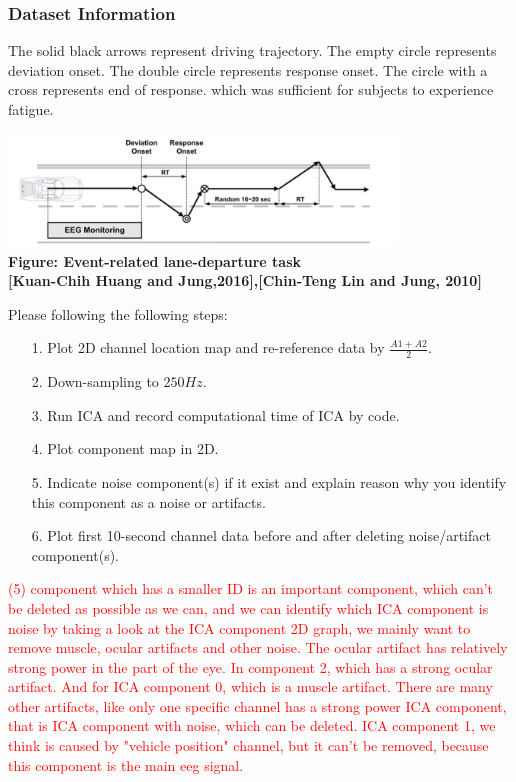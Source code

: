 \documentclass[a4 paper]{article}
\begin{document}
\subsubsection{Dataset Information}
The solid black arrows represent driving trajectory. The empty  circle represents deviation onset. The double circle represents response onset. The circle with a cross represents end of response. 
which was sufficient for subjects to experience fatigue.
\begin{center}
    \includegraphics[height=3cm]{figure/lane_keeping.JPG}\\
    \textbf{Figure: Event-related lane-departure task}\\
    \textbf{[Kuan-Chih Huang and Jung,2016],[Chin-Teng Lin and Jung, 2010]}
\end{center}
\begin{tcolorbox}[colback=RubineRed!5!white,colframe=RubineRed!75!black]
Please following the following steps:  
\begin{itemize}
    \item[1.] Plot 2D channel location map and re-reference data by $\frac{A1+A2}{2}$.
    \item[2.] Down-sampling to $250Hz$.
    \item[3.] Run ICA and record computational time of ICA by code.
    \item[4.] Plot component map in 2D.
    \item[5.] Indicate noise component(s) if it exist and explain reason why you identify this component as a noise or artifacts.
    \item[6.] Plot first 10-second channel data before and after deleting noise/artifact component(s). 
\end{itemize}
\textcolor{red}{(5) component which has a smaller ID is an important component, which can't be deleted as possible as we can, and we can identify which ICA component is noise by taking a look at the ICA component 2D graph, we mainly want to remove muscle, ocular artifacts and other noise. The ocular artifact has relatively strong power in the part of the eye. In component 2, which has a strong ocular artifact. And for ICA component 0, which is a muscle artifact. There are many other artifacts, like only one specific channel has a strong power ICA component, that is ICA component with noise, which can be deleted. ICA component 1, we think is caused by "vehicle position" channel, but it can't be removed, because this component is the main eeg signal.
}
\end{tcolorbox}
\end{document}
